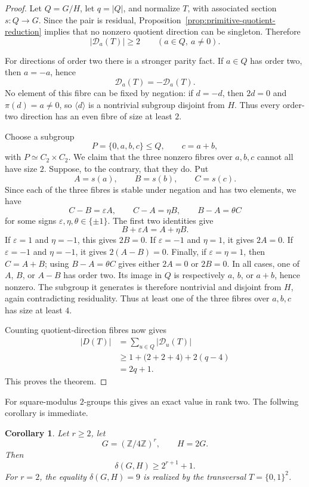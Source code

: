 \documentclass[reqno]{amsart}
\numberwithin{equation}{section}
\newtheorem{corollary}[theorem]{Corollary}
\theoremstyle{definition}
\begin{document}
\begin{proof}
Let $Q=G/H$, let $q=|Q|$, and normalize $T$, with associated section
$s:Q\to G$.  Since the pair is residual, Proposition~\ref{prop:primitive-quotient-reduction}
implies that no nonzero quotient direction can be singleton.  Therefore
\[
  |\mathcal D_a(T)|\geq 2
  \qquad(a\in Q,\ a\neq 0).
\]

For directions of order two there is a stronger parity fact.  If $a\in Q$ has
order two, then $a=-a$, hence
\[
  \mathcal D_a(T)=-\mathcal D_a(T).
\]
No element of this fibre can be fixed by negation: if $d=-d$, then $2d=0$ and
$\pi(d)=a\neq 0$, so $\langle d\rangle$ is a nontrivial subgroup disjoint from
$H$.  Thus every order-two direction has an even fibre of size at least $2$.

Choose a subgroup
\[
  P=\{0,a,b,c\}\leq Q,
  \qquad c=a+b,
\]
with $P\simeq C_2\times C_2$.  We claim that the three nonzero fibres over
$a,b,c$ cannot all have size $2$.  Suppose, to the contrary, that they do.  Put
\[
  A=s(a),\qquad B=s(b),\qquad C=s(c).
\]
Since each of the three fibres is stable under negation and has two elements,
we have
\[
  C-B=\varepsilon A,
  \qquad
  C-A=\eta B,
  \qquad
  B-A=\theta C
\]
for some signs $\varepsilon,\eta,\theta\in\{\pm1\}$.  The first two identities give
\[
  B+\varepsilon A=A+\eta B.
\]
If $\varepsilon=1$ and $\eta=-1$, this gives $2B=0$.  If $\varepsilon=-1$ and
$\eta=1$, it gives $2A=0$.  If $\varepsilon=-1$ and $\eta=-1$, it gives
$2(A-B)=0$.  Finally, if $\varepsilon=\eta=1$, then $C=A+B$; using
$B-A=\theta C$ gives either $2A=0$ or $2B=0$.  In all cases, one of $A$, $B$,
or $A-B$ has order two.  Its image in $Q$ is respectively $a$, $b$, or $a+b$,
hence nonzero.  The subgroup it generates is therefore nontrivial and disjoint
from $H$, again contradicting residuality.  Thus at least one of the three
fibres over $a,b,c$ has size at least $4$.

Counting quotient-direction fibres now gives
\[
\begin{aligned}
  |D(T)|
  &=\sum_{u\in Q}|\mathcal D_u(T)| \\
  &\geq 1+\bigl(2+2+4\bigr)+2(q-4) \\
  &=2q+1.
\end{aligned}
\]
This proves the theorem.
\end{proof}

For square-modulus \(2\)-groups this gives an exact value in rank two. The follwing corollary is immediate.
\begin{corollary}
\label{cor:two-torsion-square-modulus}
Let \(r\geq 2\), let
\[
  G=(\mathbb Z/4\mathbb Z)^r,
  \qquad H=2G.
\]
Then
\[
  \delta(G,H)\geq 2^{r+1}+1.
\]
For \(r=2\), the equality $\delta(G,H)=9$ is realized by the transversal $T=\{0,1 \}^2$.
\end{corollary}
\end{document}
